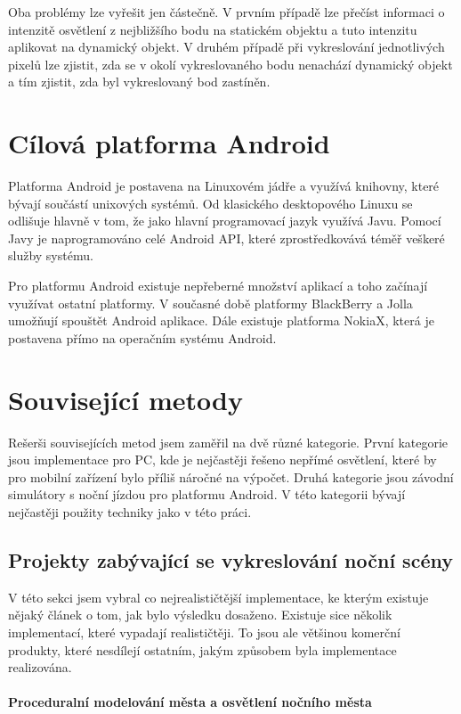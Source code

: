 \documentclass[11pt,twoside,a4paper]{book}
\begin{document}
Oba problémy lze vyřešit jen částečně. V prvním případě lze přečíst informaci o intenzitě osvětlení z nejbližšího bodu na statickém objektu a tuto intenzitu aplikovat na dynamický objekt. V druhém případě při vykreslování jednotlivých pixelů lze zjistit, zda se v okolí vykreslovaného bodu nenachází dynamický objekt a tím zjistit, zda byl vykreslovaný bod zastíněn.

\section{Cílová platforma Android}
Platforma Android je postavena na Linuxovém jádře a využívá knihovny, které bývají součástí unixových systémů. Od klasického desktopového Linuxu se odlišuje hlavně v tom, že jako hlavní programovací jazyk využívá Javu. Pomocí Javy je naprogramováno celé Android API, které zprostředkovává téměř veškeré služby systému.

Pro platformu Android existuje nepřeberné množství aplikací a toho začínají využívat ostatní platformy. V současné době platformy BlackBerry a Jolla umožňují spouštět Android aplikace. Dále existuje platforma NokiaX, která je postavena přímo na operačním systému Android.

\section{Související metody}

Rešerši souvisejících metod jsem zaměřil na dvě různé kategorie. První kategorie jsou implementace pro PC, kde je nejčastěji řešeno nepřímé osvětlení, které by pro mobilní zařízení bylo příliš náročné na výpočet. Druhá kategorie jsou závodní simulátory s noční jízdou pro platformu Android. V této kategorii bývají nejčastěji použity techniky jako v této práci.

\subsection{Projekty zabývající se vykreslování noční scény}

V této sekci jsem vybral co nejrealističtější implementace, ke kterým existuje nějaký článek o tom, jak bylo výsledku dosaženo. Existuje sice několik implementací, které vypadají realističtěji. To jsou ale většinou komerční produkty, které nesdílejí ostatním, jakým způsobem byla implementace realizována.

\paragraph{Proceduralní modelování města a osvětlení nočního města}\mbox{}\\
\end{document}
